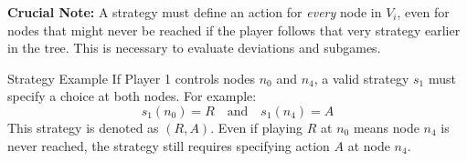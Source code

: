 \documentclass[12pt, a4paper]{article}
\begin{document}
\textbf{Crucial Note:} A strategy must define an action for \textit{every} node in $V_i$, even for nodes that might never be reached if the player follows that very strategy earlier in the tree. This is necessary to evaluate deviations and subgames.

\begin{exbox}{Strategy Example}
  If Player 1 controls nodes $n_0$ and $n_4$, a valid strategy $s_1$ must specify a choice at both nodes. For example:
  \[ s_1(n_0) = R \quad \text{and} \quad s_1(n_4) = A \]
  This strategy is denoted as $(R, A)$. Even if playing $R$ at $n_0$ means node $n_4$ is never reached, the strategy still requires specifying action $A$ at node $n_4$.
\end{exbox}
\end{document}
